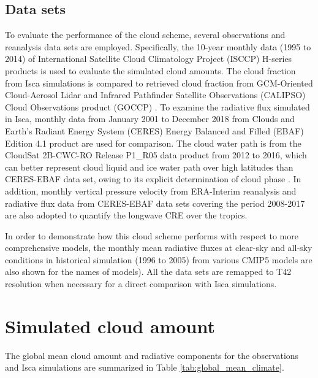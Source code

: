 \subsection{Data sets}
To evaluate the performance of the cloud scheme, several observations and reanalysis data sets are employed. Specifically, the 10-year monthly data (1995 to 2014) of International Satellite Cloud Climatology Project (ISCCP) H-series products  \citep{Young2018} is used to evaluate the simulated cloud amounts. The cloud fraction from Isca simulations is compared to retrieved cloud fraction from GCM-Oriented Cloud-Aerosol Lidar and Infrared Pathfinder Satellite Observations (CALIPSO) Cloud Observations product (GOCCP)  \citep{Chepfer2010}. To examine the radiative flux simulated in Isca, monthly data from January 2001 to December 2018 from Clouds and Earth's Radiant Energy System (CERES)  Energy Balanced and Filled (EBAF) Edition 4.1 product \citep[CERES-EBAF hereafter;][]{Loeb2018} are used for comparison. The cloud water path is from the CloudSat  2B-CWC-RO Release P1\_R05 data product \citep{Austin2009} from 2012 to 2016, which can better represent cloud liquid and ice water path over high latitudes than CERES-EBAF data set, owing to its explicit determination of cloud phase \citep{Lenaerts2017}. In addition, monthly vertical pressure velocity from ERA-Interim reanalysis and radiative flux data from CERES-EBAF data sets covering the period 2008-2017 are also adopted to quantify the longwave CRE over the tropics.

In order to demonstrate how this cloud scheme performs with respect to more comprehensive models, the monthly mean radiative fluxes at clear-sky and all-sky conditions in historical simulation (1996 to 2005) from various CMIP5 models are also shown for the names of models). All the data sets are remapped to T42 resolution when necessary for a direct comparison with Isca simulations.

\section{Simulated cloud amount}
\label{sec:cld_amt}

The global mean cloud amount and radiative components for the observations and Isca simulations are summarized in Table \ref{tab:global_mean_climate}. 

